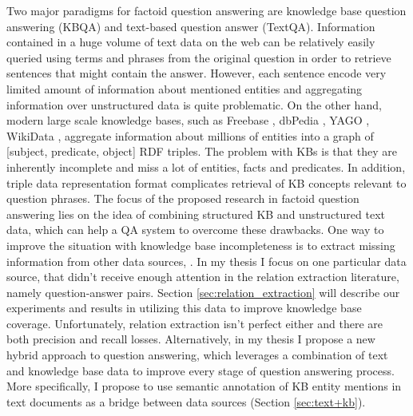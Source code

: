 Two major paradigms for factoid question answering are knowledge base question answering (KBQA) and text-based question answer (TextQA).
Information contained in a huge volume of text data on the web can be relatively easily queried using terms and phrases from the original question in order to retrieve sentences that might contain the answer.
However, each sentence encode very limited amount of information about mentioned entities and aggregating information over unstructured data is quite problematic.
On the other hand, modern large scale knowledge bases, such as Freebase \cite{Bollacker:2008:FCC:1376616.1376746}, dbPedia \cite{auer2007dbpedia}, YAGO \cite{yago3}, WikiData \cite{vrandevcic2014wikidata}, aggregate information about millions of entities into a graph of [subject, predicate, object] RDF triples.
The problem with KBs is that they are inherently incomplete and miss a lot of entities, facts and predicates.
In addition, triple data representation format complicates retrieval of KB concepts relevant to question phrases.
The focus of the proposed research in factoid question answering lies on the idea of combining structured KB and unstructured text data, which can help a QA system to overcome these drawbacks.
One way to improve the situation with knowledge base incompleteness is to extract missing information from other data sources, \eg \cite{Cafarella:2008:WEP:1453856.1453916,Cafarella:2009:WES:1519103.1519112,Dong:2014:KVW:2623330.2623623,Etzioni:2008:OIE:1409360.1409378,Gupta:2014:BOS:2732286.2732288,kushmerick1997wrapper}.
In my thesis I focus on one particular data source, that didn't receive enough attention in the relation extraction literature, namely question-answer pairs.
Section \ref{sec:relation_extraction} will describe our experiments and results in utilizing this data to improve knowledge base coverage.
Unfortunately, relation extraction isn't perfect either and there are both precision and recall losses.
Alternatively, in my thesis I propose a new hybrid approach to question answering, which leverages a combination of text and knowledge base data to improve every stage of question answering process.
More specifically, I propose to use semantic annotation of KB entity mentions in text documents as a bridge between data sources (Section \ref{sec:text+kb}).

